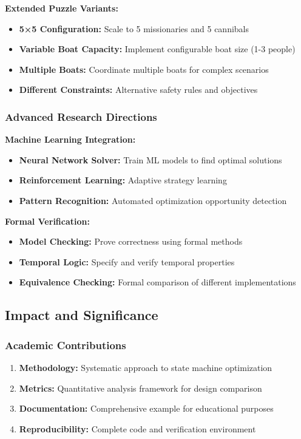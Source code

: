 \documentclass[12pt,letterpaper]{article}
\begin{document}
\textbf{Extended Puzzle Variants:}
\begin{itemize}
    \item \textbf{5×5 Configuration:} Scale to 5 missionaries and 5 cannibals
    \item \textbf{Variable Boat Capacity:} Implement configurable boat size (1-3 people)
    \item \textbf{Multiple Boats:} Coordinate multiple boats for complex scenarios
    \item \textbf{Different Constraints:} Alternative safety rules and objectives
\end{itemize}

\subsubsection{Advanced Research Directions}

\textbf{Machine Learning Integration:}
\begin{itemize}
    \item \textbf{Neural Network Solver:} Train ML models to find optimal solutions
    \item \textbf{Reinforcement Learning:} Adaptive strategy learning
    \item \textbf{Pattern Recognition:} Automated optimization opportunity detection
\end{itemize}

\textbf{Formal Verification:}
\begin{itemize}
    \item \textbf{Model Checking:} Prove correctness using formal methods
    \item \textbf{Temporal Logic:} Specify and verify temporal properties
    \item \textbf{Equivalence Checking:} Formal comparison of different implementations
\end{itemize}

\subsection{Impact and Significance}

\subsubsection{Academic Contributions}
\begin{enumerate}
    \item \textbf{Methodology:} Systematic approach to state machine optimization
    \item \textbf{Metrics:} Quantitative analysis framework for design comparison
    \item \textbf{Documentation:} Comprehensive example for educational purposes
    \item \textbf{Reproducibility:} Complete code and verification environment
\end{enumerate}
\end{document}
